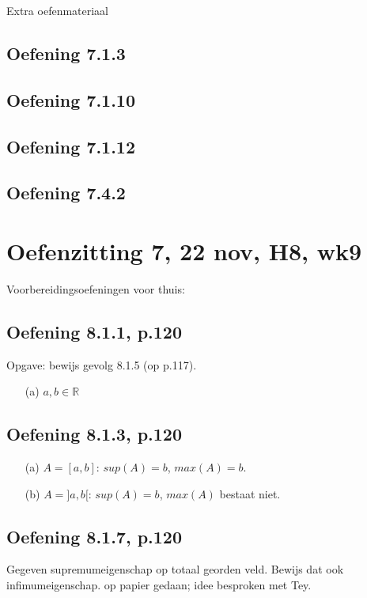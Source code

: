 \documentclass{article}
\begin{document}
Extra oefenmateriaal 


\subsection*{Oefening 7.1.3}
\subsection*{Oefening 7.1.10}
\subsection*{Oefening 7.1.12}
\subsection*{Oefening 7.4.2 }


\section{Oefenzitting 7, 22 nov, H8, wk9}


Voorbereidingsoefeningen voor thuis: 

\subsection{Oefening 8.1.1, p.120}
Opgave: bewijs gevolg 8.1.5 (op p.117). 

\begin{itemize}
    \item [(a)] $a,b \in \mathbb{R}$
\end{itemize}


\subsection{Oefening 8.1.3, p.120}
\begin{itemize}
    \item [(a)] $A= [ a,b ] $: $sup (A)=b$, $max (A)=b$. 
    \item [(b)] $A= ] a,b [ $: $sup (A)=b$, $max (A)$ bestaat niet. 
\end{itemize}



\subsection{Oefening 8.1.7, p.120}
Gegeven supremumeigenschap op totaal georden veld. Bewijs dat ook infimumeigenschap. 
op papier gedaan; idee besproken met Tey. 
\end{document}
